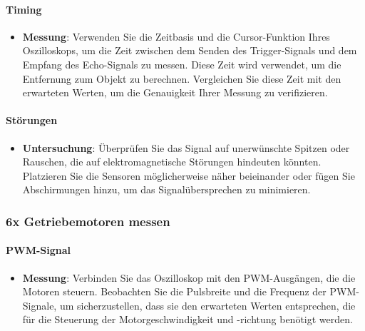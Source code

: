 \documentclass{vorlage-design-main}
\begin{document}
\hypertarget{timing}{%
\paragraph{Timing}\label{timing}}

\begin{itemize}

\item
  \textbf{Messung}: Verwenden Sie die Zeitbasis und die Cursor-Funktion
  Ihres Oszilloskops, um die Zeit zwischen dem Senden des
  Trigger-Signals und dem Empfang des Echo-Signals zu messen. Diese Zeit
  wird verwendet, um die Entfernung zum Objekt zu berechnen. Vergleichen
  Sie diese Zeit mit den erwarteten Werten, um die Genauigkeit Ihrer
  Messung zu verifizieren.
\end{itemize}

\hypertarget{stuxf6rungen}{%
\paragraph{Störungen}\label{stoerungen}}

\begin{itemize}

\item
  \textbf{Untersuchung}: Überprüfen Sie das Signal auf unerwünschte
  Spitzen oder Rauschen, die auf elektromagnetische Störungen hindeuten
  könnten. Platzieren Sie die Sensoren möglicherweise näher beieinander
  oder fügen Sie Abschirmungen hinzu, um das Signalübersprechen zu
  minimieren.
\end{itemize}

\hypertarget{x-getriebemotoren-messen}{%
\subsubsection{6x Getriebemotoren
messen}\label{x-getriebemotoren-messen}}

\hypertarget{pwm-signal}{%
\paragraph{PWM-Signal}\label{pwm-signal}}

\begin{itemize}

\item
  \textbf{Messung}: Verbinden Sie das Oszilloskop mit den PWM-Ausgängen,
  die die Motoren steuern. Beobachten Sie die Pulsbreite und die
  Frequenz der PWM-Signale, um sicherzustellen, dass sie den erwarteten
  Werten entsprechen, die für die Steuerung der Motorgeschwindigkeit und
  -richtung benötigt werden.
\end{itemize}
\end{document}

